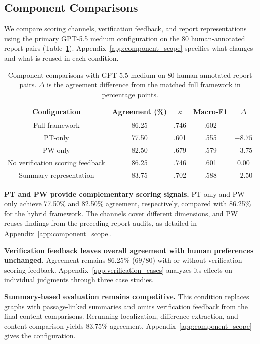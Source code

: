 \documentclass{article}
\begin{document}
\subsection{Component Comparisons}
\label{sec:component_analysis}
We compare scoring channels, verification feedback, and report representations using the primary GPT-5.5 medium configuration on the 80 human-annotated report pairs (Table~\ref{tab:ablations}). Appendix~\ref{app:component_scope} specifies what changes and what is reused in each condition.

\begin{table}[t]
\centering
\small
\setlength{\tabcolsep}{5pt}


\begin{tabular}{@{}ccccc@{}}
\toprule
Configuration & Agreement (\%) & $\kappa$ & Macro-F1 & $\Delta$ \\
\midrule
Full framework & 86.25 & .746 & .602 & --- \\
PT-only & 77.50 & .601 & .555 & $-8.75$ \\
PW-only & 82.50 & .679 & .579 & $-3.75$ \\
No verification scoring feedback & 86.25 & .746 & .601 & $0.00$ \\
Summary representation & 83.75 & .702 & .588 & $-2.50$ \\
\bottomrule
\end{tabular}
\caption{Component comparisons with GPT-5.5 medium on 80 human-annotated report pairs. $\Delta$ is the agreement difference from the matched full framework in percentage points.}
\label{tab:ablations}
\end{table}

\textbf{PT and PW provide complementary scoring signals.}
PT-only and PW-only achieve 77.50\% and 82.50\% agreement, respectively, compared with 86.25\% for the hybrid framework. The channels cover different dimensions, and PW reuses findings from the preceding report audits, as detailed in Appendix~\ref{app:component_scope}.

\textbf{Verification feedback leaves overall agreement with human preferences unchanged.}
Agreement remains 86.25\% (69/80) with or without verification scoring feedback. Appendix~\ref{app:verification_cases} analyzes its effects on individual judgments through three case studies. 

\textbf{Summary-based evaluation remains competitive.}
This condition replaces graphs with passage-linked summaries and omits verification feedback from the final content comparisons. Rerunning localization, difference extraction, and content comparison yields 83.75\% agreement. Appendix~\ref{app:component_scope} gives the configuration.
\end{document}
